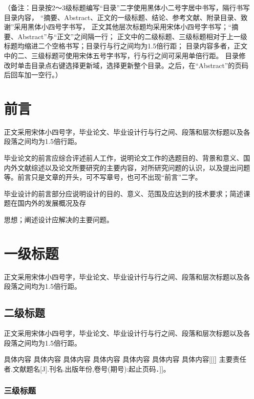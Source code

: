 \documentclass{sicnuthesis}
\begin{document}
\newpage

\tableofcontents

（备注：目录按2～3级标题编写“目录”二字使用黑体小二号字居中书写，隔行书写目录内容，
“摘要、Abstract、正文的一级标题、结论、参考文献、附录目录、致谢”采用黑体小四号字书写，
正文其他层次标题均采用宋体小四号字书写；“摘要、Abstract”与“正文”之间隔一行；
正文中的二级标题、三级标题相对于上一级标题均缩进二个空格书写；目录行与行之间均为1.5倍行距；
目录内容多者，正文中的二、三级标题可使用宋体五号字书写，行与行之间可采用单倍行距。
目录修改时单击目录点右键选择更新域，选择更新整个目录。之后，在“Abstract”的页码后回车加一空行。）

\newpage

\mainmatter %

\section{前言}

正文采用宋体小四号字，毕业论文、毕业设计行与行之间、段落和层次标题以及各段落之间均为1.5倍行距。

毕业论文的前言应综合评述前人工作，说明论文工作的选题目的、背景和意义、国内外文献综述以及论文所要研究的主要内容，对所研究问题的认识，以及提出问题等。前言只是文章的开头，可不写章号，也可不出现“前言”二字。

毕业设计的前言部分应说明设计的目的、意义、范围及应达到的技术要求；简述课题在国内外的发展概况及存

思想；阐述设计应解决的主要问题。

\section{一级标题}

正文采用宋体小四号字，毕业论文、毕业设计行与行之间、段落和层次标题以及各段落之间均为1.5倍行距。

\subsection{二级标题}

正文采用宋体小四号字，毕业论文、毕业设计行与行之间、段落和层次标题以及各段落之间均为1.5倍行距。

具体内容 具体内容 具体内容 具体内容 具体内容 具体内容 具体内容[[[] 主要责任者.文献题名[J].刊名.出版年份,卷号(期号):起止页码．]]。

\subsubsection{三级标题}
\end{document}
